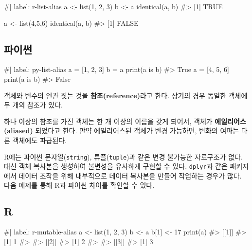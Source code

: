 \documentclass[
  letterpaper,
]{book}
\newenvironment{Shaded}{\begin{snugshade}}{\end{snugshade}}
\newcommand{\NormalTok}[1]{\textcolor[rgb]{0.00,0.23,0.31}{#1}}
\begin{document}
\begin{Shaded}
\begin{Highlighting}[]
\NormalTok{\#| label: r{-}list{-}alias}
\NormalTok{a \textless{}{-} list(1, 2, 3)}
\NormalTok{b \textless{}{-} a}
\NormalTok{identical(a, b)}
\NormalTok{\#\textgreater{} [1] TRUE}

\NormalTok{a \textless{}{-} list(4,5,6)}
\NormalTok{identical(a, b)}
\NormalTok{\#\textgreater{} [1] FALSE}
\end{Highlighting}
\end{Shaded}

\subsection{파이썬}

\begin{Shaded}
\begin{Highlighting}[]
\NormalTok{\#| label: py{-}list{-}alias}
\NormalTok{a = [1, 2, 3]}
\NormalTok{b = a}
\NormalTok{print(a is b)}
\NormalTok{\#\textgreater{} True}
\NormalTok{a = [4, 5, 6]}
\NormalTok{print(a is b)}
\NormalTok{\#\textgreater{} False}
\end{Highlighting}
\end{Shaded}

객체와 변수의 연관 짓는 것을 \textbf{참조(reference)}라고 한다. 상기의
경우 동일한 객체에 두 개의 참조가 있다. 

하나 이상의 참조를 가진 객체는 한 개 이상의 이름을 갖게 되어서, 객체가
\textbf{에일리어스(aliased)} 되었다고 한다. 만약 에일리어스된 객체가
변경 가능하면, 변화의 여파는 다른 객체에도 파급된다. 

R에는 파이썬 문자열(\texttt{string}), 튜플(\texttt{tuple})과 같은 변경
불가능한 자료구조가 없다. 대신 객체 복사본을 생성하여 불변성을 유사하게
구현할 수 있다. \texttt{dplyr}과 같은 패키지에서 데이터 조작을 위해
내부적으로 데이터 복사본을 만들어 작업하는 경우가 많다. 다음 예제를 통해
R과 파이썬 차이를 확인할 수 있다.

\subsection{R}

\begin{Shaded}
\begin{Highlighting}[]
\NormalTok{\#| label: r{-}mutable{-}alias}
\NormalTok{a \textless{}{-}  list(1, 2, 3)}
\NormalTok{b \textless{}{-}  a}
\NormalTok{b[1] \textless{}{-}  17}
\NormalTok{print(a)}
\NormalTok{\#\textgreater{} [[1]]}
\NormalTok{\#\textgreater{} [1] 1}
\NormalTok{\#\textgreater{} }
\NormalTok{\#\textgreater{} [[2]]}
\NormalTok{\#\textgreater{} [1] 2}
\NormalTok{\#\textgreater{} }
\NormalTok{\#\textgreater{} [[3]]}
\NormalTok{\#\textgreater{} [1] 3}
\end{Highlighting}
\end{Shaded}
\end{document}
